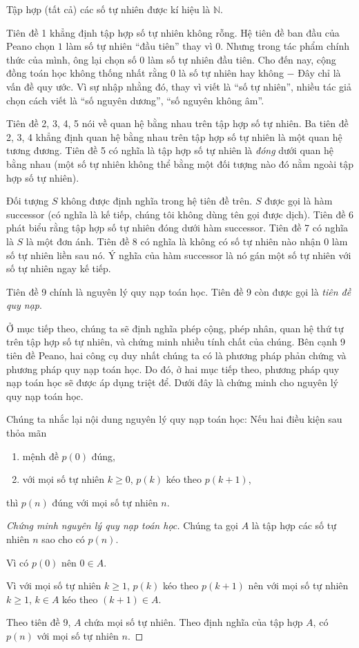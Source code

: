 Tập hợp (tất cả) các số tự nhiên được kí hiệu là $\mathbb{N}$.

Tiên đề 1 khẳng định tập hợp số tự nhiên không rỗng. Hệ tiên đề ban đầu của Peano chọn $1$ làm số tự nhiên ``đầu tiên'' thay vì $0$. Nhưng trong tác phẩm chính thức của mình, ông lại chọn số $0$ làm số tự nhiên đầu tiên. Cho đến nay, cộng đồng toán học không thống nhất rằng $0$ là số tự nhiên hay không $-$ Đây chỉ là vấn đề quy ước. Vì sự nhập nhằng đó, thay vì viết là ``số tự nhiên'', nhiều tác giả chọn cách viết là ``số nguyên dương'', ``số nguyên không âm''.

Tiên đề 2, 3, 4, 5 nói về quan hệ bằng nhau trên tập hợp số tự nhiên. Ba tiên đề 2, 3, 4 khẳng định quan hệ bằng nhau trên tập hợp số tự nhiên là một quan hệ tương đương. Tiên đề 5 có nghĩa là tập hợp số tự nhiên là \textit{đóng} dưới quan hệ bằng nhau (một số tự nhiên không thể bằng một đối tượng nào đó nằm ngoài tập hợp số tự nhiên).

Đối tượng $S$ không được định nghĩa trong hệ tiên đề trên. $S$ được gọi là hàm successor (có nghĩa là kế tiếp, chúng tôi không dùng tên gọi được dịch). Tiên đề 6 phát biểu rằng tập hợp số tự nhiên đóng dưới hàm successor. Tiên đề 7 có nghĩa là $S$ là một đơn ánh. Tiên đề 8 có nghĩa là không có số tự nhiên nào nhận $0$ làm số tự nhiên liền sau nó. Ý nghĩa của hàm successor là nó gán một số tự nhiên với số tự nhiên ngay kế tiếp.

Tiên đề 9 chính là nguyên lý quy nạp toán học. Tiên đề 9 còn được gọi là \textit{tiên đề quy nạp}.

Ở mục tiếp theo, chúng ta sẽ định nghĩa phép cộng, phép nhân, quan hệ thứ tự trên tập hợp số tự nhiên, và chứng minh nhiều tính chất của chúng. Bên cạnh 9 tiên đề Peano, hai công cụ duy nhất chúng ta có là phương pháp phản chứng và phương pháp quy nạp toán học. Do đó, ở hai mục tiếp theo, phương pháp quy nạp toán học sẽ được áp dụng triệt để. Dưới đây là chứng minh cho nguyên lý quy nạp toán học.

Chúng ta nhắc lại nội dung nguyên lý quy nạp toán học: Nếu hai điều kiện sau thỏa mãn
\begin{enumerate}[label={(\roman*)}]
	\item mệnh đề $p(0)$ đúng,
	\item với mọi số tự nhiên $k\geq 0$, $p(k)$ kéo theo $p(k+1)$,
\end{enumerate}

thì $p(n)$ đúng với mọi số tự nhiên $n$.

\begin{proof}[Chứng minh nguyên lý quy nạp toán học]
	Chúng ta gọi $A$ là tập hợp các số tự nhiên $n$ sao cho có $p(n)$.

	Vì có $p(0)$ nên $0\in A$.

	Vì với mọi số tự nhiên $k\geq 1$, $p(k)$ kéo theo $p(k+1)$ nên với mọi số tự nhiên $k\geq 1$, $k\in A$ kéo theo $(k+1)\in A$.

	Theo tiên đề 9, $A$ chứa mọi số tự nhiên. Theo định nghĩa của tập hợp $A$, có $p(n)$ với mọi số tự nhiên $n$.
\end{proof}

